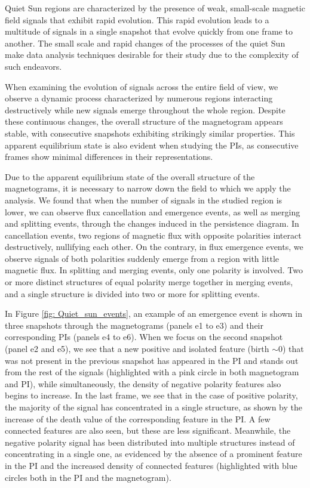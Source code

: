 \documentclass[12pt]{mythesis}
\begin{document}
Quiet Sun regions are characterized by the presence of weak, small-scale magnetic field signals that exhibit rapid evolution. This rapid evolution leads to a multitude of signals in a single snapshot that evolve quickly from one frame to another. The small scale and rapid changes of the processes of the quiet Sun make data analysis techniques desirable for their study due to the complexity of such endeavors. 

When examining the evolution of signals across the entire field of view, we observe a dynamic process characterized by numerous regions interacting destructively while new signals emerge throughout the whole region. Despite these continuous changes, the overall structure of the magnetogram appears stable, with consecutive snapshots exhibiting strikingly similar properties. This apparent equilibrium state is also evident when studying the PIs, as consecutive frames show minimal differences in their representations.

Due to the apparent equilibrium state of the overall structure of the magnetograms, it is necessary to narrow down the field to which we apply the analysis. We found that when the number of signals in the studied region is lower, we can observe flux cancellation and emergence events, as well as merging and splitting events, through the changes induced in the persistence diagram. In cancellation events, two regions of magnetic flux with opposite polarities interact destructively, nullifying each other. On the contrary, in flux emergence events, we observe signals of both polarities suddenly emerge from a region with little magnetic flux. In splitting and merging events, only one polarity is involved. Two or more distinct structures of equal polarity merge together in merging events, and a single structure is divided into two or more for splitting events.

In Figure \ref{fig: Quiet_sun_events}, an example of an emergence event is shown in three snapshots through the magnetograms (panels e1 to e3) and their corresponding PIs (panels e4 to e6). When we focus on the second snapshot (panel e2 and e5), we see that a new positive and isolated feature (birth $\sim 0$) that was not present in the previous snapshot has appeared in the PI and stands out from the rest of the signals (highlighted with a pink circle in both magnetogram and PI), while simultaneously, the density of negative polarity features also begins to increase. In the last frame, we see that in the case of positive polarity, the majority of the signal has concentrated in a single structure, as shown by the increase of the death value of the corresponding feature in the PI. A few connected features are also seen, but these are less significant. Meanwhile, the negative polarity signal has been distributed into multiple structures instead of concentrating in a single one, as evidenced by the absence of a prominent feature in the PI and the increased density of connected features (highlighted with blue circles both in the PI and the magnetogram).
\end{document}
